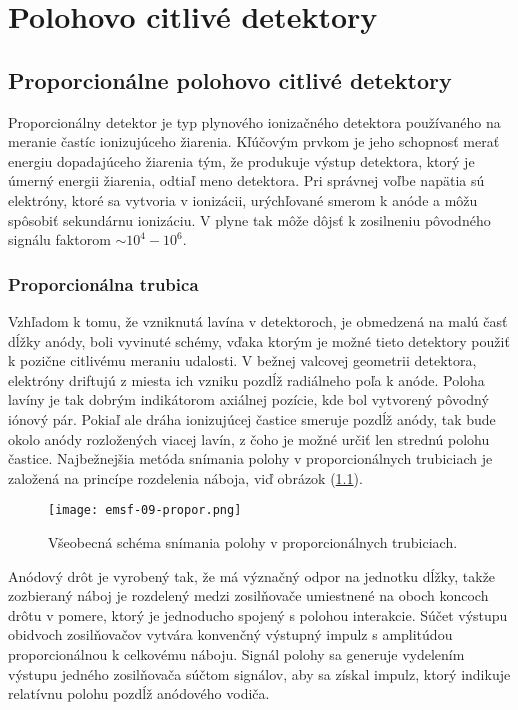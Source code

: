 \documentclass[../../main.tex]{subfiles}
\begin{document}
\chapter{Polohovo citlivé detektory}

\section{Proporcionálne polohovo citlivé detektory}
Proporcionálny detektor je typ plynového ionizačného detektora používaného na meranie častíc ionizujúceho žiarenia. Kľúčovým prvkom je jeho schopnosť merať energiu dopadajúceho žiarenia tým, že produkuje výstup detektora, ktorý je úmerný energii žiarenia, odtiaľ meno detektora. Pri správnej voľbe napätia sú elektróny, ktoré sa vytvoria v ionizácii, urýchľované smerom k anóde a môžu spôsobiť sekundárnu ionizáciu. V plyne tak môže dôjsť k zosilneniu pôvodného signálu faktorom $\sim 10^4 - 10^6$.

\subsection{Proporcionálna trubica}
Vzhľadom k tomu, že vzniknutá lavína v detektoroch, je obmedzená na malú časť dĺžky anódy, boli vyvinuté schémy, vďaka ktorým je možné tieto detektory použiť k pozične citlivému meraniu udalosti. V bežnej valcovej geometrii detektora, elektróny driftujú z miesta ich vzniku pozdĺž radiálneho poľa k anóde. Poloha lavíny je tak dobrým indikátorom axiálnej pozície, kde bol vytvorený pôvodný iónový pár. Pokiaľ ale dráha ionizujúcej častice smeruje pozdĺž anódy, tak bude okolo anódy rozložených viacej lavín, z čoho je možné určiť len strednú polohu častice. Najbežnejšia metóda snímania polohy v proporcionálnych trubiciach je založená na princípe rozdelenia náboja, viď obrázok (\ref{em9:fig:propor}).

\begin{figure}[!h]
\texttt{[image: emsf-09-propor.png]}
\centering
\caption{Všeobecná schéma snímania polohy v proporcionálnych trubiciach.}
\label{em9:fig:propor}
\end{figure}

Anódový drôt je vyrobený tak, že má význačný odpor na jednotku dĺžky, takže zozbieraný náboj je rozdelený medzi zosilňovače umiestnené na oboch koncoch drôtu v pomere, ktorý je jednoducho spojený s polohou interakcie. Súčet výstupu obidvoch zosilňovačov vytvára konvenčný výstupný impulz s amplitúdou proporcionálnou k celkovému náboju. Signál polohy sa generuje vydelením výstupu jedného zosilňovača súčtom signálov, aby sa získal impulz, ktorý indikuje relatívnu polohu pozdĺž anódového vodiča.
\end{document}
